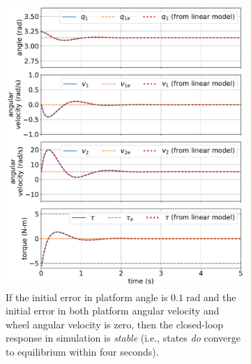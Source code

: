 \documentclass[conf]{new-aiaa}
\begin{document}
\begin{figure}[p]
\centering
\begin{subfigure}[t]{0.49\textwidth}
\centering
\includegraphics[width=\textwidth]{fig01}
\caption{If the initial error in platform angle is $0.1\;\text{rad}$ and the initial error in both platform angular velocity and wheel angular velocity is zero, then the closed-loop response in simulation is {\em stable} (i.e., states {\em do} converge to equilibrium within four seconds).}
\label{fig-stable}
\end{subfigure}
\hfill
\begin{subfigure}[t]{0.49\textwidth}
\centering

\end{subfigure}
\end{figure}
\end{document}
